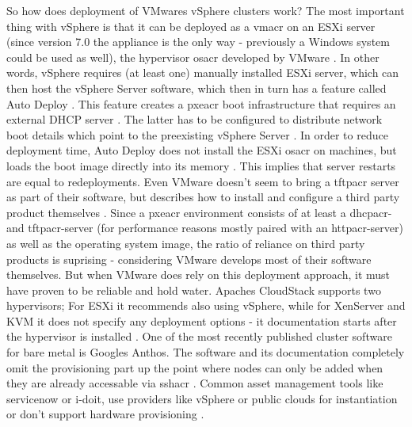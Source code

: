 So how does deployment of VMwares vSphere clusters work? The most important thing with vSphere is that it can be deployed as a \gls{vmacr} on an ESXi server (since version 7.0 the appliance is the only way - previously a Windows system could be used as well), the hypervisor \gls{osacr} developed by VMware \cite{vmware_farewell_windows} \cite{vmware_vsphere_installation} \cite{vmware_vcenter_deployment}. In other words, vSphere requires (at least one) manually installed ESXi server, which can then host the vSphere Server software, which then in turn has a feature called Auto Deploy \cite{vmware_installing_esxi}. This feature creates a \gls{pxeacr} boot infrastructure that requires an external DHCP server \cite{vmware_intro_autodeploy} \cite{vmware_autodeploy_process}. The latter has to be configured to distribute network boot details which point to the preexisting vSphere Server \cite{vmware_intro_autodeploy}.
In order to reduce deployment time, Auto Deploy does not install the ESXi \gls{osacr} on machines, but loads the boot image directly into its memory \cite{vmware_provisioning_esxi_using_autodeploy}. This implies that server restarts are equal to redeployments.
\newline
Even VMware doesn't seem to bring a \gls{tftpacr} server as part of their software, but describes how to install and configure a third party product themselves \cite{vmware_install_tftp}. Since a \gls{pxeacr} environment consists of at least a \gls{dhcpacr}- and \gls{tftpacr}-server (for performance reasons mostly paired with an \gls{httpacr}-server) as well as the operating system image, the ratio of reliance on third party products is suprising - considering VMware develops most of their software themselves. But when VMware does rely on this deployment approach, it must have proven to be reliable and hold water. %
Apaches CloudStack supports two hypervisors; For ESXi it recommends also using vSphere, while for XenServer and KVM it does not specify any deployment options - it documentation starts after the hypervisor is installed \cite{cloudstack_installation}.
\newline
One of the most recently published cluster software for bare metal is Googles Anthos. The software and its documentation completely omit the provisioning part up the point where nodes can only be added when they are already accessable via \gls{sshacr} \cite{anthos_bare_metal}.
\newline
Common asset management tools like servicenow or i-doit, use providers like vSphere or public clouds for instantiation \cite{servicenow_setup_guide_vmware_cloud} or don't support hardware provisioning \cite{idoit_vm_provisioning}.
